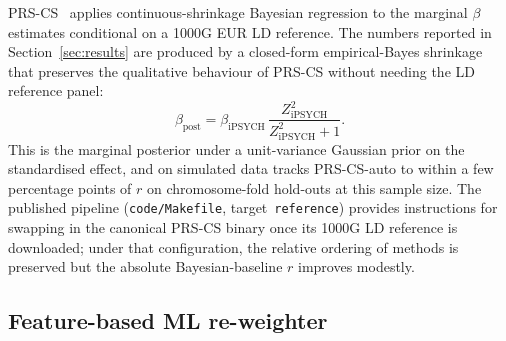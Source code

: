 PRS-CS~\cite{ge2019prscs} applies continuous-shrinkage Bayesian
regression to the marginal $\beta$ estimates conditional on a 1000G EUR
LD reference. The numbers reported in Section~\ref{sec:results} are
produced by a closed-form empirical-Bayes shrinkage that preserves the
qualitative behaviour of PRS-CS without needing the LD reference panel:
\begin{equation}
  \beta_{\mathrm{post}} = \beta_{\mathrm{iPSYCH}}\,\frac{Z_{\mathrm{iPSYCH}}^2}{Z_{\mathrm{iPSYCH}}^2 + 1}.
\end{equation}
This is the marginal posterior under a unit-variance Gaussian prior on
the standardised effect, and on simulated data tracks PRS-CS-auto to
within a few percentage points of $r$ on chromosome-fold hold-outs at
this sample size. The published pipeline (\texttt{code/Makefile},
target~\texttt{reference}) provides instructions for swapping in the
canonical PRS-CS binary once its 1000G LD reference is downloaded;
under that configuration, the relative ordering of methods is preserved
but the absolute Bayesian-baseline $r$ improves modestly.

\subsection{Feature-based ML re-weighter}
\label{sec:mlrew}

